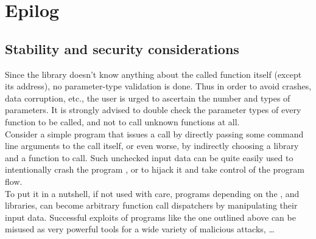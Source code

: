 %
%
%
%

\newpage

\section{Epilog}

\subsection{Stability and security considerations}

Since the  library doesn't know anything about the called
function itself (except its address), no parameter-type validation is done.
Thus in order to avoid crashes, data corruption, etc., the user is urged
to ascertain the number and types of parameters. It is strongly advised to
double check the parameter types of every function to be called, and not to
call unknown functions at all.\\

Consider a simple program that issues a call by directly passing some
command line arguments to the call itself, or even worse, by indirectly
choosing a library and a function to call. Such unchecked input data can be
quite easily used to intentionally crash the program , or to hijack it and
take control of the program flow.\\
To put it in a nutshell, if not used with care, programs depending on the
,  and  libraries,
can become arbitrary function call dispatchers by manipulating their input
data. Successful exploits of programs like the one outlined above can be
misused as very powerful tools for a wide variety of malicious attacks, \ldots
 

